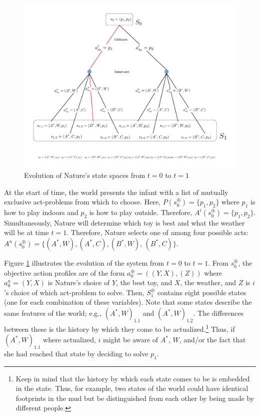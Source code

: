 \documentclass[
11pt,
titlepage,
reqno,
]{article}%
\theoremstyle{definition}
\begin{document}
	\begin{figure}[h!]
		\centering
		\includegraphics*[page=1,trim = 0in 4in 0in 0in,scale=.6]{Awareness_Diagrams_All}
		\caption{Evolution of Nature's state spaces from $t=0$ to $t=1$\label{Diag: p-01}}%
	\end{figure}
	
	At the start of time, the world presents the infant with a list of mutually exclusive act-problems from which to choose. 
	Here, $P(s^\oplus_0)=\{p_1,p_2\}$ where $p_1$ is how to play indoors and $p_2$ is how to play outside.
	Therefore, $A^i(s^\oplus_0)=\{p_1,p_2\}$.
	Simultaneously, Nature will determine which toy is best and what the weather will be at time $t=1$.
	Therefore, Nature selects one of among four possible acts: $A^n(s^\oplus_0)=\{(A^\ast,W),(A^\ast,C),(B^\ast,W)$, $(B^\ast,C)\}$.
	
	
	Figure \ref{Diag: p-01} illustrates the evolution of the system from $t=0$ to $t=1$. 
	From $s^\oplus_0$, the objective action profiles are of the form $a^\oplus_0=((Y,X),(Z))$ where $a^n_0=(Y,X)$ is Nature's choice of  $Y$, the best toy, and $X$, the weather, and $Z$ is $i$'s choice of which act-problem to solve.
	Then, $S^\oplus_1$ contains eight possible states (one for each combination of these variables).
	Note that some states describe the same features of the world; e.g., $(A^\ast,W)_{1.1}$ and $(A^\ast,W)_{1.2}$. 
	The differences between these is the history by which they come to be actualized.\footnote
	{
		Keep in mind that the history by which each state comes to be is embedded in the state. 
		Thus, for example, two states of the world could have identical footprints in the mud but be distinguished from each other by being made by different people.
	} 
	Thus, if $(A^\ast,W)_{1.1}$ where actualized, $i$ might be aware of $A^\ast$, $W$, and/or the fact that she had reached that state by deciding to solve $p_1$.
	
\end{document}
